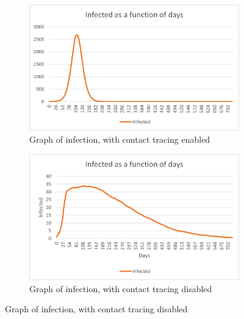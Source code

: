 \begin{figure}[H]
  \centering
  
  \begin{subfigure}{.45\textwidth}
    \centering
    \includegraphics[width=.95\linewidth]{0_billeder/covidInfectionGraphA.png}
    \caption{Graph of infection, with contact tracing enabled}
    \label{Subfig:covidInfGraphA}
  \end{subfigure}
  
  \begin{subfigure}{.45\textwidth}
    \centering
    \includegraphics[width=.95\linewidth]{0_billeder/covidInfectionGraphB.png.png}
    \caption{Graph of infection, with contact tracing disabled}
    \label{Subfig:covidInfGraphB}
  \end{subfigure}
  \label{Fig:covidInfGraphs}
  
\end{figure}








%



